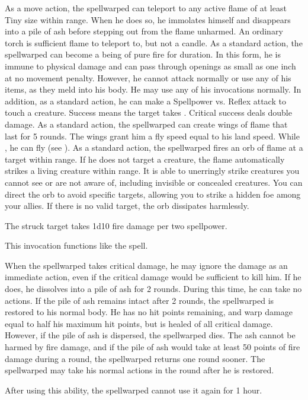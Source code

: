            As a move action, the spellwarped can teleport to any active flame of at least Tiny size within \rngmed range.
            When he does so, he immolates himself and disappears into a pile of ash before stepping out from the flame unharmed.
            An ordinary torch is sufficient flame to teleport to, but not a candle.
            As a standard action, the spellwarped can become a being of pure fire for \durshort duration.
            In this form, he is immune to physical damage and can pass through openings as small as one inch at no movement penalty.
            However, he cannot attack normally or use any of his items, as they meld into his body.
            He may use any of his invocations normally.
            In addition, as a standard action, he can make a Spellpower vs. Reflex attack to touch a creature.
            Success means the target takes .
            Critical success deals double damage.
            As a standard action, the spellwarped can create wings of flame that last for 5 rounds.
            The wings grant him a fly speed equal to his land speed.
            While , he can fly (see ).
            As a standard action, the spellwarped fires an orb of flame at a target within \rnglong range.
            If he does not target a creature, the flame automatically strikes a living creature within range.
            It is able to unerringly strike creatures you cannot see or are not aware of, including invisible or concealed creatures.
            You can direct the orb to avoid specific targets, allowing you to strike a hidden foe among your allies.
            If there is no valid target, the orb dissipates harmlessly.
            \par The struck target takes 1d10 fire damage per two spellpower.

            This invocation functions like the  spell.

            When the spellwarped takes critical damage, he may ignore the damage as an immediate action, even if the critical damage would be sufficient to kill him.
            If he does, he dissolves into a pile of ash for 2 rounds.
            During this time, he can take no actions.
            If the pile of ash remains intact after 2 rounds, the spellwarped is restored to his normal body.
            He has no hit points remaining, and warp damage equal to half his maximum hit points, but is healed of all critical damage.
            However, if the pile of ash is dispersed, the spellwarped dies.
            The ash cannot be harmed by fire damage, and if the pile of ash would take at least 50 points of fire damage during a round, the spellwarped returns one round sooner.
            The spellwarped may take his normal actions in the round after he is restored.
            \par After using this ability, the spellwarped cannot use it again for 1 hour.

